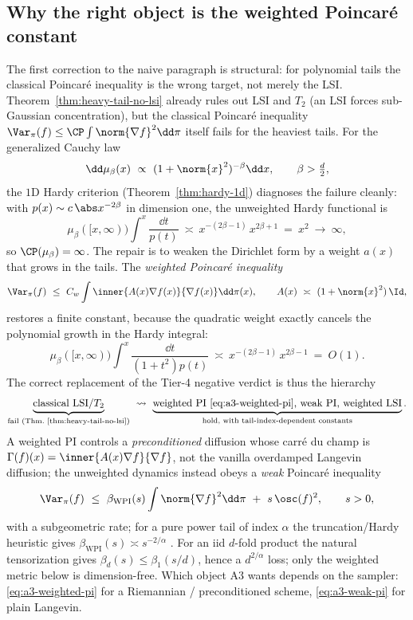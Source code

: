 \documentclass[../../main.tex]{subfiles}
\begin{document}
\subsection{Why the right object is the weighted Poincar\'e constant}
\label{subsec:a3-weighted}

The first correction to the naive paragraph is structural: for polynomial tails the classical
Poincar\'e inequality is the wrong target, not merely the LSI. Theorem~\ref{thm:heavy-tail-no-lsi}
already rules out LSI and $T_2$ (an LSI forces sub-Gaussian concentration), but the classical
Poincar\'e inequality $\Var_\pi(f)\le\CP\int\norm{\nabla f}^2\dd\pi$ itself fails for the heaviest
tails. For the generalized Cauchy law
\begin{equation}\label{eq:a3-gencauchy}
  \dd\mu_\beta(x)\ \propto\ (1+\norm{x}^2)^{-\beta}\dd x,
  \qquad \beta>\tfrac d2,
\end{equation}
the $1$D Hardy criterion (Theorem~\ref{thm:hardy-1d}) diagnoses the failure cleanly: with
$p(x)\sim c\,\abs x^{-2\beta}$ in dimension one, the unweighted Hardy functional is
\[
  \mu_\beta([x,\infty))\int^x\frac{\dd t}{p(t)}
  \ \asymp\ x^{-(2\beta-1)}\,x^{2\beta+1}\ =\ x^{2}\ \to\ \infty,
\]
so $\CP(\mu_\beta)=\infty$. The repair is to weaken the Dirichlet form by a weight $a(x)$ that
grows in the tails. The \emph{weighted Poincar\'e inequality}
\begin{equation}\label{eq:a3-weighted-pi}
  \Var_\pi(f)\ \le\ C_w\int\inner{A(x)\nabla f(x)}{\nabla f(x)}\dd\pi(x),
  \qquad A(x)\ \asymp\ (1+\norm{x}^2)\,\Id,
\end{equation}
restores a finite constant, because the quadratic weight exactly cancels the polynomial growth in
the Hardy integral:
\[
  \mu_\beta([x,\infty))\int^x\frac{\dd t}{(1+t^2)p(t)}
  \ \asymp\ x^{-(2\beta-1)}\,x^{2\beta-1}\ =\ O(1).
\]
The correct replacement of the Tier-4 negative verdict is thus the hierarchy
\begin{equation}\label{eq:a3-hierarchy}
  \underbrace{\text{classical LSI}/T_2}_{\text{fail (Thm.~\ref{thm:heavy-tail-no-lsi})}}
  \ \leadsto\
  \underbrace{\text{weighted PI \eqref{eq:a3-weighted-pi}, weak PI, weighted LSI}}_{\text{hold, with tail-index-dependent constants}} .
\end{equation}
A weighted PI controls a \emph{preconditioned} diffusion whose carr\'e du champ is
$\Gamma(f)(x)=\inner{A(x)\nabla f}{\nabla f}$, not the vanilla overdamped Langevin diffusion;
the unweighted dynamics instead obeys a \emph{weak} Poincar\'e inequality
\begin{equation}\label{eq:a3-weak-pi}
  \Var_\pi(f)\ \le\ \beta_{\mathrm{WPI}}(s)\int\norm{\nabla f}^2\dd\pi\ +\ s\,\osc(f)^2,
  \qquad s>0,
\end{equation}
with a subgeometric rate; for a pure power tail of index $\alpha$ the truncation/Hardy heuristic
gives $\beta_{\mathrm{WPI}}(s)\asymp s^{-2/\alpha}$ \cite{CattiauxGozlanGuillinRoberto2010}.
For an iid $d$-fold product the natural tensorization gives
$\beta_d(s)\le\beta_1(s/d)$, hence a $d^{2/\alpha}$ loss; only the weighted metric below is
dimension-free.
Which object A3 wants depends on the sampler: \eqref{eq:a3-weighted-pi} for a Riemannian /
preconditioned scheme, \eqref{eq:a3-weak-pi} for plain Langevin.
\end{document}
